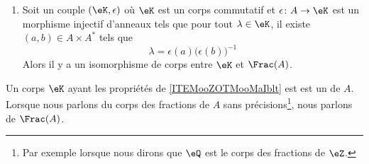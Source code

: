 \begin{proposition}
\begin{enumerate}
		\item\label{ITEMooZOTMooMaIblt}
		      Soit un couple \( (\eK,\epsilon)\) où \( \eK\) est un corps commutatif et \( \epsilon\colon A\to \eK\) est un morphisme injectif d'anneaux tels que pour tout \( \lambda\in\eK\), il existe \( (a,b)\in A\times A^*\) tels que
		      \begin{equation}
			      \lambda=\epsilon(a)\big( \epsilon(b) \big)^{-1}
		      \end{equation}
		      Alors il y a un isomorphisme de corps entre \( \eK\) et \( \Frac(A)\).
	\end{enumerate}
	Un corps \( \eK\) ayant les propriétés de \ref{ITEMooZOTMooMaIblt} est est un  de \( A\). Lorsque nous parlons du corps des fractions de \( A\) sans précisions\footnote{Par exemple lorsque nous dirons que \( \eQ\) est le corps des fractions de \( \eZ\).}, nous parlons de \( \Frac(A)\).
\end{proposition}


